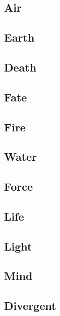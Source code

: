 \filbreak
\begin{multicols}{2}

\subsection{Air}


\subsection{Earth}


\subsection{Death}


\subsection{Fate}


\subsection{Fire}


\subsection{Water}


\subsection{Force}


\subsection{Life}


\subsection{Light}


\subsection{Mind}


\subsection{Divergent}


\end{multicols}
